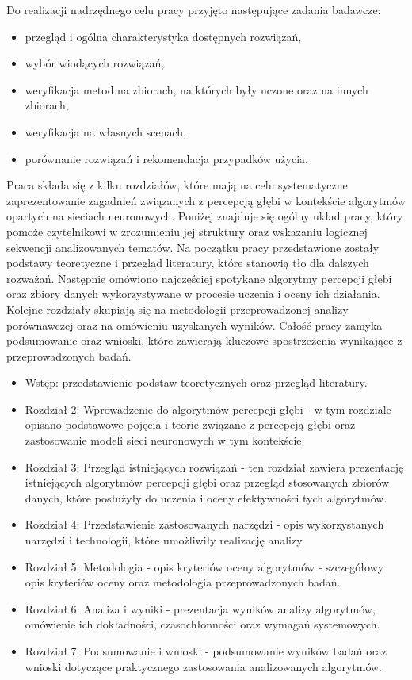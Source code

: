 Do realizacji nadrzędnego celu pracy przyjęto następujące zadania badawcze:
\begin{itemize}
    \item przegląd i ogólna charakterystyka dostępnych rozwiązań,
    \item wybór wiodących rozwiązań,
    \item weryfikacja metod na zbiorach, na których były uczone oraz na innych zbiorach,
    \item weryfikacja na własnych scenach,
    \item porównanie rozwiązań i rekomendacja przypadków użycia.
\end{itemize}

Praca składa się z kilku rozdziałów, które mają na celu systematyczne zaprezentowanie zagadnień związanych z percepcją głębi w kontekście algorytmów opartych na sieciach neuronowych. Poniżej znajduje się ogólny układ pracy, który pomoże czytelnikowi w zrozumieniu jej struktury oraz wskazaniu logicznej sekwencji analizowanych tematów.
Na początku pracy przedstawione zostały podstawy teoretyczne i przegląd literatury, które stanowią tło dla dalszych rozważań. Następnie omówiono najczęściej spotykane algorytmy percepcji głębi oraz zbiory danych wykorzystywane w procesie uczenia i oceny ich działania. Kolejne rozdziały skupiają się na metodologii przeprowadzonej analizy porównawczej oraz na omówieniu uzyskanych wyników. Całość pracy zamyka podsumowanie oraz wnioski, które zawierają kluczowe spostrzeżenia wynikające z przeprowadzonych badań.

\begin{itemize}
    \item Wstęp: przedstawienie podstaw teoretycznych oraz przegląd literatury.

    \item Rozdział 2: Wprowadzenie do algorytmów percepcji głębi - w tym rozdziale opisano podstawowe pojęcia i teorie związane z percepcją głębi oraz zastosowanie modeli sieci neuronowych w tym kontekście.

    \item Rozdział 3: Przegląd istniejących rozwiązań - ten rozdział zawiera prezentację istniejących algorytmów percepcji głębi oraz przegląd stosowanych zbiorów danych, które posłużyły do uczenia i oceny efektywności tych algorytmów.
    
    \item Rozdział 4: Przedstawienie zastosowanych narzędzi - opis wykorzystanych narzędzi i technologii, które umożliwiły realizację analizy.
    
    \item Rozdział 5: Metodologia - opis kryteriów oceny algorytmów - szczegółowy opis kryteriów oceny oraz metodologia przeprowadzonych badań.
    
    \item Rozdział 6: Analiza i wyniki - prezentacja wyników analizy algorytmów, omówienie ich dokładności, czasochłonności oraz wymagań systemowych.
    
    \item Rozdział 7: Podsumowanie i wnioski - podsumowanie wyników badań oraz wnioski dotyczące praktycznego zastosowania analizowanych algorytmów.
\end{itemize}
